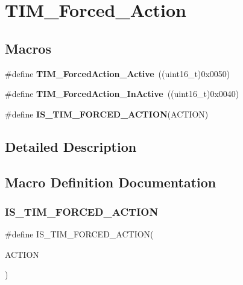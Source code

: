\section{T\+I\+M\+\_\+\+Forced\+\_\+\+Action}
\label{group__TIM__Forced__Action}
\subsection*{Macros}
\begin{DoxyCompactItemize}
\item 
\#define \textbf{ T\+I\+M\+\_\+\+Forced\+Action\+\_\+\+Active}~((uint16\+\_\+t)0x0050)
\item 
\#define \textbf{ T\+I\+M\+\_\+\+Forced\+Action\+\_\+\+In\+Active}~((uint16\+\_\+t)0x0040)
\item 
\#define \textbf{ I\+S\+\_\+\+T\+I\+M\+\_\+\+F\+O\+R\+C\+E\+D\+\_\+\+A\+C\+T\+I\+ON}(A\+C\+T\+I\+ON)
\end{DoxyCompactItemize}


\subsection{Detailed Description}


\subsection{Macro Definition Documentation}
\mbox{\label{group__TIM__Forced__Action_gaa2cb16f281d32c95ab974dc5157bfa63}} 
\subsubsection{I\+S\+\_\+\+T\+I\+M\+\_\+\+F\+O\+R\+C\+E\+D\+\_\+\+A\+C\+T\+I\+ON}
{\footnotesize\ttfamily \#define I\+S\+\_\+\+T\+I\+M\+\_\+\+F\+O\+R\+C\+E\+D\+\_\+\+A\+C\+T\+I\+ON(\begin{DoxyParamCaption}\item[{}]{A\+C\+T\+I\+ON }\end{DoxyParamCaption})}

